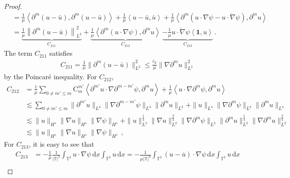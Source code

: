 \documentclass[10pt,a4paper]{amsart}
\def\d{\mathrm{d}}
\begin{document}
\begin{proof}
\begin{align*}
&= \frac{1}{\mu} \left\langle \partial^m (u - \bar{u}), \partial^m (u - \bar{u}) \right\rangle + \frac{1}{\mu} \left\langle u - \bar{u}, \bar{u} \right\rangle + \frac{1}{\mu} \left\langle \partial^m \left( u \cdot \nabla \psi - \overline{u \cdot \nabla \psi} \right), \partial^m u \right\rangle \\
&= \underbrace{\frac{1}{\mu} \left\| \partial^m (u - \bar{u}) \right\|^2_{L^2}}_{{C}_{211}} + \underbrace{\frac{1}{\mu} \left\langle \partial^m (u \cdot \nabla \psi), \partial^m u \right\rangle}_{{C}_{212}} \ \underbrace{ - \frac{1}{\mu}\overline{u \cdot \nabla \psi} \left\langle \mathbf{1}, u \right\rangle}_{{C}_{213}} \,.
\end{align*}
The term $C_{211}$ satisfies
\begin{equation*}
\begin{aligned}
C_{211}= \frac{1}{\mu}\| \partial^m ( u-\bar{u}) \|^2_{L^2}\leq \frac{c_p}{\mu}\|\nabla \partial^m u\|^2_{L^2} 
\end{aligned}
\end{equation*}
by the Poincar\'e inequality. For $C_{212}$,
\begin{equation*}
\begin{aligned}
C_{212}&= \frac{1}{\mu} \sum_{0 \neq m' \leq m} \mathrm{C}_m^{m'} \left\langle \partial^{m'} u \cdot \nabla \partial^{m - m'} \psi, \partial^m u \right\rangle + \frac{1}{\mu} \left\langle u \cdot \nabla \partial^m \psi, \partial^m u \right\rangle \\
&\lesssim \sum_{0 \neq m' \leq m} \|\partial^{m'} u\|_{L^4} \|\nabla \partial^{m - m'} \psi\|_{L^4} \|\partial^m u\|_{L^2} + \|u\|_{L^4} \|\nabla \partial^m \psi\|_{L^2} \|\partial^m u\|_{L^4} \\
&\lesssim \|u\|_{H^s} \|\nabla u\|_{H^s} \|\nabla \psi\|_{H^s} + \|u\|_{L^2}^{\frac{1}{4}} \|\nabla u\|_{L^2}^{\frac{3}{4}} \|\nabla \partial^m \psi\|_{L^2} \|\partial^m u\|_{L^2}^{\frac{1}{4}} \|\nabla\partial^m u\|_{L^2}^{\frac{3}{4}} \\
&\lesssim \|u\|_{H^s} \|\nabla u\|_{H^s} \|\nabla \psi\|_{H^s} \,,
\end{aligned}
\end{equation*}
For $C_{213}$, it is easy to see that
\begin{equation*}
\begin{aligned}
C_{213}&=-\frac{1}{\mu} \frac{1}{|\mathbb{T}|^3} \int_{\mathbb{T}^3} u \cdot \nabla \psi \, \d x \int_{\mathbb{T}^3} u \, \d x = -\frac{1}{\mu |\mathbb{T}|^3} \int_{\mathbb{T}^3} (u - \overline{u})\cdot \nabla \psi \, \d x \int_{\mathbb{T}^3} u \, \d x \\

\end{aligned}
\end{equation*}
\end{proof}
\end{document}
